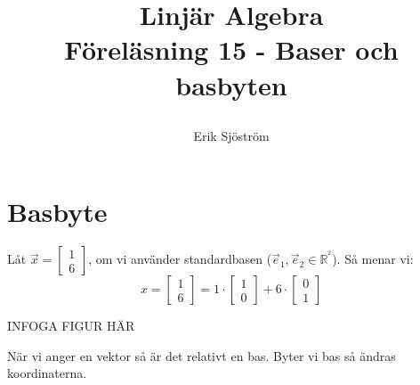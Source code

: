 

\title{
	 Linjär Algebra\\
	 Föreläsning 15 - Baser och basbyten
    \author{Erik Sjöström}
}

\maketitle

\section{Basbyte} %
\label{sec:basbyte}
\begin{Ex}
	Låt $\vec{x} = \begin{bmatrix} 1\\6 \end{bmatrix}$, om vi använder standardbasen ($\vec{e}_1, \vec{e}_2 \in \mathbb{R}^^2$). Så menar vi:
	\[
	x = \begin{bmatrix} 1\\6 \end{bmatrix} = 1 \cdot \begin{bmatrix} 1\\0 \end{bmatrix} + 6 \cdot \begin{bmatrix} 0\\1 \end{bmatrix}
	\]
	\begin{center}
		INFOGA FIGUR HÄR
	\end{center}
\end{Ex}
När vi anger en vektor så är det relativt en bas. Byter vi bas så ändras koordinaterna.
